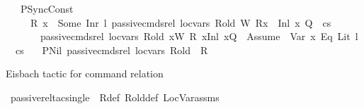 \begin{isabellebody}
\ \ {\isacharbar}{\kern0pt}\ PSyncConst{\isacharcolon}{\kern0pt}\isanewline
\ \ \ \ {\isachardoublequoteopen}{\isasymlbrakk}\ R\ x\ {\isacharequal}{\kern0pt}\ Some\ {\isacharparenleft}{\kern0pt}Inr\ l{\isacharparenright}{\kern0pt}{\isacharsemicolon}{\kern0pt}\ passive{\isacharunderscore}{\kern0pt}cmds{\isacharunderscore}{\kern0pt}rel\ loc{\isacharunderscore}{\kern0pt}vars\ R{\isacharunderscore}{\kern0pt}old\ W\ {\isacharparenleft}{\kern0pt}R{\isacharparenleft}{\kern0pt}x\ {\isasymmapsto}\ {\isacharparenleft}{\kern0pt}Inl\ x{}{\isacharparenright}{\kern0pt}{\isacharparenright}{\kern0pt}{\isacharparenright}{\kern0pt}\ Q\ {\isacharbrackleft}{\kern0pt}{\isacharbrackright}{\kern0pt}\ cs\ {\isasymrbrakk}\ {\isasymLongrightarrow}\isanewline
\ \ \ \ \ \ \ passive{\isacharunderscore}{\kern0pt}cmds{\isacharunderscore}{\kern0pt}rel\ loc{\isacharunderscore}{\kern0pt}vars\ R{\isacharunderscore}{\kern0pt}old\ {\isacharparenleft}{\kern0pt}x{}{\isacharhash}{\kern0pt}W{\isacharparenright}{\kern0pt}\ R\ {\isacharparenleft}{\kern0pt}{\isacharparenleft}{\kern0pt}x{\isacharcomma}{\kern0pt}{\isacharparenleft}{\kern0pt}Inl\ x{}{\isacharparenright}{\kern0pt}{\isacharparenright}{\kern0pt}{\isacharhash}{\kern0pt}Q{\isacharparenright}{\kern0pt}\ {\isacharbrackleft}{\kern0pt}{\isacharbrackright}{\kern0pt}\ {\isacharparenleft}{\kern0pt}{\isacharparenleft}{\kern0pt}Assume\ {\isacharparenleft}{\kern0pt}\ {\isacharparenleft}{\kern0pt}Var\ x{}{\isacharparenright}{\kern0pt}\ {\isasymguillemotleft}Eq{\isasymguillemotright}\ {\isacharparenleft}{\kern0pt}Lit\ l{\isacharparenright}{\kern0pt}{\isacharparenright}{\kern0pt}{\isacharparenright}{\kern0pt}\ {\isacharhash}{\kern0pt}\ cs{\isacharparenright}{\kern0pt}{\isachardoublequoteclose}\isanewline
\ \ {\isacharbar}{\kern0pt}\ PNil{\isacharcolon}{\kern0pt}\ {\isachardoublequoteopen}passive{\isacharunderscore}{\kern0pt}cmds{\isacharunderscore}{\kern0pt}rel\ loc{\isacharunderscore}{\kern0pt}vars\ R{\isacharunderscore}{\kern0pt}old\ {\isacharbrackleft}{\kern0pt}{\isacharbrackright}{\kern0pt}\ R\ {\isacharbrackleft}{\kern0pt}{\isacharbrackright}{\kern0pt}\ {\isacharbrackleft}{\kern0pt}{\isacharbrackright}{\kern0pt}\ {\isacharbrackleft}{\kern0pt}{\isacharbrackright}{\kern0pt}{\isachardoublequoteclose}%
\begin{isamarkuptext}%
Eisbach tactic for command relation%
\end{isamarkuptext}\isamarkuptrue%
\isamarkupfalse%
\ passive{\isacharunderscore}{\kern0pt}rel{\isacharunderscore}{\kern0pt}tac{\isacharunderscore}{\kern0pt}single\ \ R{\isacharunderscore}{\kern0pt}def\ R{\isacharunderscore}{\kern0pt}old{\isacharunderscore}{\kern0pt}def\ LocVar{\isacharunderscore}{\kern0pt}assms\ {\isacharequal}{\kern0pt}\ \isanewline

\end{isabellebody}
